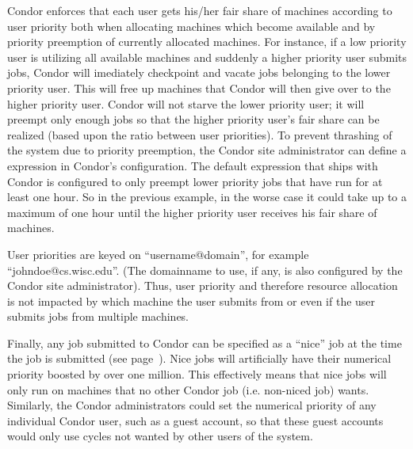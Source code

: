 Condor enforces that each user gets his/her fair share of machines
according to user priority both when allocating machines which become
available and by priority preemption of currently allocated machines.
For instance, if a low priority user is utilizing all available machines
and suddenly a higher priority user submits jobs, Condor will
imediately checkpoint and vacate jobs belonging to the lower priority
user. This will free up machines that Condor will then give over to the
higher priority user. Condor will not starve the lower priority user; it
will preempt only enough jobs so that the higher priority user's fair
share can be realized (based upon the ratio between user priorities). To
prevent thrashing of the system due to priority preemption, the Condor 
site administrator can define a  expression in Condor's configuration.
The default expression that ships with Condor is configured to only preempt 
lower priority jobs that have run
for at least one hour. So in the previous example, in the worse case it
could take up to a maximum of one hour until the higher priority user
receives his fair share of machines. 

User priorities are keyed on ``username@domain'', for example
``johndoe@cs.wisc.edu''. (The domainname to use, if any, is also configured by
the Condor site administrator).  Thus, user priority and therefore resource
allocation is not impacted by which machine the user submits from or
even if the user submits jobs from multiple machines.

Finally, any job submitted to Condor can be specified as a ``nice'' job at 
the time the job is submitted (see page~\pageref{man-condor-submit-nice}).
Nice jobs will artificially have their numerical priority boosted by
over one million. This effectively means that nice jobs will only run on
machines that no other Condor job (i.e. non-niced job) wants. Similarly,
the Condor administrators could set the numerical priority of any
individual Condor user, such as a guest account, so that these guest
accounts would only use cycles not wanted by other users of the system.






